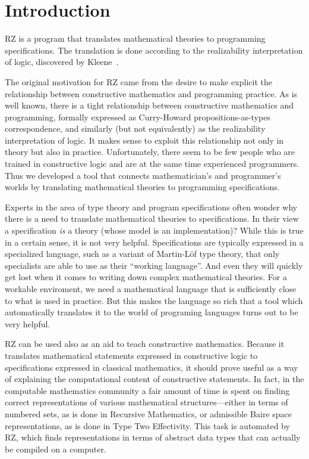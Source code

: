 \chapter{Introduction}
\label{cha:introduction}

RZ is a program that translates mathematical theories to programming
specifications. The translation is done according to the realizability
interpretation of logic, discovered by Kleene~\cite{KleeneSC:intint}.

The original motivation for RZ came from the desire to make explicit
the relationship between constructive mathematics and programming
practice. As is well known, there is a tight relationship between
constructive mathematics and programming, formally expressed as
Curry-Howard propositions-as-types correspondence, and similarly (but
not equivalently) as the realizability interpretation of logic. It
makes sense to exploit this relationship not only in theory but also
in practice. Unfortunately, there seem to be few people who are
trained in constructive logic and are at the same time experienced
programmers. Thus we developed a tool that connects mathematician's
and programmer's worlds by translating mathematical theories to
programming specifications.

Experts in the area of type theory and program specifications often
wonder why there is a need to translate mathematical theories to
specifications. In their view a specification \emph{is} a theory
(whose model is an implementation)? While this is true in a certain
sense, it is not very helpful. Specifications are typically expressed
in a specialized language, such as a variant of Martin-L\"of type
theory, that only specialists are able to use as their ``working
language''. And even they will quickly get lost when it comes to
writing down complex mathematical theories. For a workable enviroment,
we need a mathematical language that is sufficiently close to what is
used in practice. But this makes the language so rich that a tool
which automatically translates it to the world of programing languages
turns out to be very helpful.

RZ can be used also as an aid to teach constructive mathematics.
Because it translates mathematical statements expressed in
constructive logic to specifications expressed in classical
mathematics, it should prove useful as a way of explaining the
computational content of constructive statements. In fact, in the
computable mathematics community a fair amount of time is spent on
finding correct representations of various mathematical
structures---either in terms of numbered sets, as is done in Recursive
Mathematics, or admissible Baire space representations, as is done in
Type Two Effectivity. This task is automated by RZ, which finds
representations in terms of abstract data types that can actually be
compiled on a computer.


